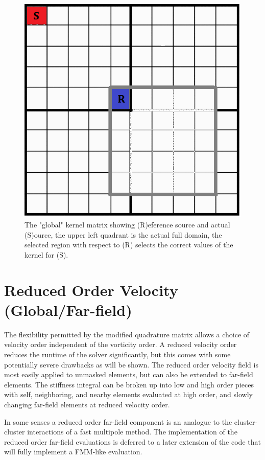 \documentclass[letterpaper,12pt]{report}
\begin{document}
\begin{figure}
\centering
\includegraphics[width=5.5in]{GlobalKernel.PNG}
\caption{\label{fig:GlobalKernel}The "global" kernel matrix showing (R)eference source and actual (S)ource, the upper left quadrant is the actual full domain, the selected region with respect to (R) selects the correct values of the kernel for (S).}
\end{figure}

%
\section{Reduced Order Velocity (Global/Far-field)}
The flexibility permitted by the modified quadrature matrix allows a choice of velocity order independent of the vorticity order. A reduced velocity order reduces the runtime of the solver significantly, but this comes with some potentially severe drawbacks as will be shown. The reduced order velocity field is most easily applied to unmasked elements, but can also be extended to far-field elements. The stiffness integral can be broken up into low and high order pieces with self, neighboring, and nearby elements evaluated at high order, and slowly changing far-field elements at reduced velocity order.

In some senses a reduced order far-field component is an analogue to the cluster-cluster interactions of a fast multipole method. The implementation of the reduced order far-field evaluations is deferred to a later extension of the code that will fully implement a FMM-like evaluation.
%
\end{document}
